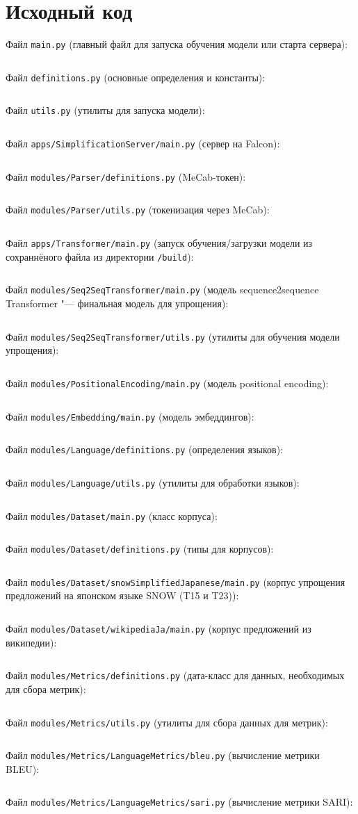 \chapter{Исходный код}\label{appendix-code}							%

\newcommand{\sourceCodeFile}[2]{%
	Файл \texttt{#1} (#2):
	\inputminted[tabsize=2, lineos, breaklines, mathescape, fontsize=\fontsize{12}{12}\selectfont]{python}{code/#1}%
}

\sourceCodeFile{main.py}{главный файл для запуска обучения модели или старта сервера}
\sourceCodeFile{definitions.py}{основные определения и константы}
\sourceCodeFile{utils.py}{утилиты для запуска модели}

\sourceCodeFile{apps/SimplificationServer/main.py}{сервер на Falcon}
\sourceCodeFile{modules/Parser/definitions.py}{MeCab-токен}
\sourceCodeFile{modules/Parser/utils.py}{токенизация через MeCab}

\sourceCodeFile{apps/Transformer/main.py}{запуск обучения/загрузки модели из сохраннёного файла из директории \texttt{/build}}

\sourceCodeFile{modules/Seq2SeqTransformer/main.py}{модель sequence2sequence Transformer "--- финальная модель для упрощения}
\sourceCodeFile{modules/Seq2SeqTransformer/utils.py}{утилиты для обучения модели упрощения}

\sourceCodeFile{modules/PositionalEncoding/main.py}{модель positional encoding}

\sourceCodeFile{modules/Embedding/main.py}{модель эмбеддингов}

\sourceCodeFile{modules/Language/definitions.py}{определения языков}
\sourceCodeFile{modules/Language/utils.py}{утилиты для обработки языков}

\sourceCodeFile{modules/Dataset/main.py}{класс корпуса}
\sourceCodeFile{modules/Dataset/definitions.py}{типы для корпусов}
\sourceCodeFile{modules/Dataset/snowSimplifiedJapanese/main.py}{корпус упрощения предложений на японском языке SNOW (T15 и T23)}
\sourceCodeFile{modules/Dataset/wikipediaJa/main.py}{корпус предложений из википедии}

\sourceCodeFile{modules/Metrics/definitions.py}{дата-класс для данных, необходимых для сбора метрик}
\sourceCodeFile{modules/Metrics/utils.py}{утилиты для сбора данных для метрик}
\sourceCodeFile{modules/Metrics/LanguageMetrics/bleu.py}{вычисление метрики BLEU}
\sourceCodeFile{modules/Metrics/LanguageMetrics/sari.py}{вычисление метрики SARI}

